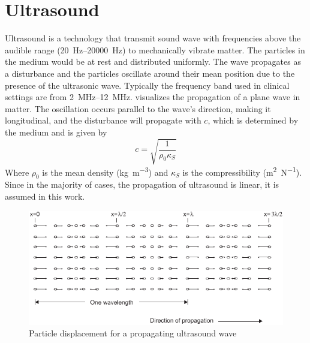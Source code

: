 \section{Ultrasound}
Ultrasound is a technology that transmit sound wave with frequencies above the audible range (\SIrange{20}{20000}{\hertz}) to mechanically vibrate matter. The particles in the medium would be at rest and distributed uniformly. The wave propagates as a disturbance and the particles oscillate around their mean position due to the presence of the ultrasonic wave. Typically the frequency band used in clinical settings are from \SIrange{2}{12}{\mega\hertz}.  visualizes the propagation of a plane wave in matter. The oscillation occurs parallel to the wave's direction, making it longitudinal, and the disturbance will propagate with $c$, which is determined by the medium and is given by
\begin{equation}
	c = \sqrt{\frac{1}{\rho_{0} \kappa_{S}}}
\end{equation}
Where $\rho_{0}$ is the mean density (\si{\kilogram\per\meter\cubed}) and $\kappa_{S}$ is the  compressibility (\si{\meter\squared\per\newton}). Since in the majority of cases, the propagation of ultrasound is linear, it is assumed in this work. 

\begin{figure}[ht]
	\centering
	\includegraphics[width=.6\textwidth]{Figures/plane_wave_jensen-cropped.pdf}
	\caption{Particle displacement for a propagating ultrasound wave \cite{JensenUltrasoundBook}}
	\label{fig:planewave_jensen}
\end{figure}



%	

%

